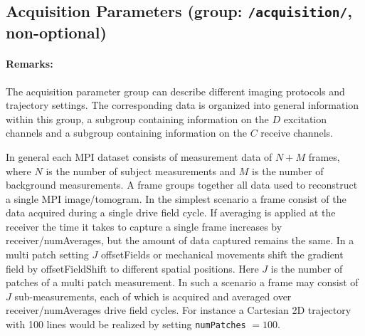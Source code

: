 \documentclass[landscape,a4paper]{article} %
\newcommand{\inl}[1]{\lstinline[columns=fixed]{#1}}
\newcommand{\inlvar}[1]{{\ttfamily#1}}
\begin{document}
\subsection{Acquisition Parameters (group: \inl{/acquisition/}, non-optional)}

\begin{multicols}{2}
\paragraph{Remarks:} The acquisition parameter group can describe different imaging protocols and trajectory settings. The corresponding data is organized into general information within this group, a subgroup containing information on the $D$ excitation channels and a subgroup containing information on the $C$ receive channels.

In general each MPI dataset consists of measurement data of $N+M$ frames, where $N$ is the number of subject measurements and $M$ is the number of background measurements. A frame groups together all data used to reconstruct a single MPI image/tomogram. In the simplest scenario a frame consist of the data acquired during a single drive field cycle. If averaging is applied at the receiver the time it takes to capture a single frame increases by \inlvar{receiver/numAverages}, but the amount of data captured remains the same. In a multi patch setting $J$ \inlvar{offsetField}s or mechanical movements shift the gradient field by \inlvar{offsetFieldShift} to different spatial positions. Here $J$ is the number of patches of a multi patch measurement. In such a scenario a frame may consist of $J$ sub-measurements, each of which is acquired and averaged over \inlvar{receiver/numAverages} drive field cycles. For instance a Cartesian 2D trajectory with 100 lines would be realized by setting \inl{numPatches} $ = 100$.
\end{multicols}
\end{document}
